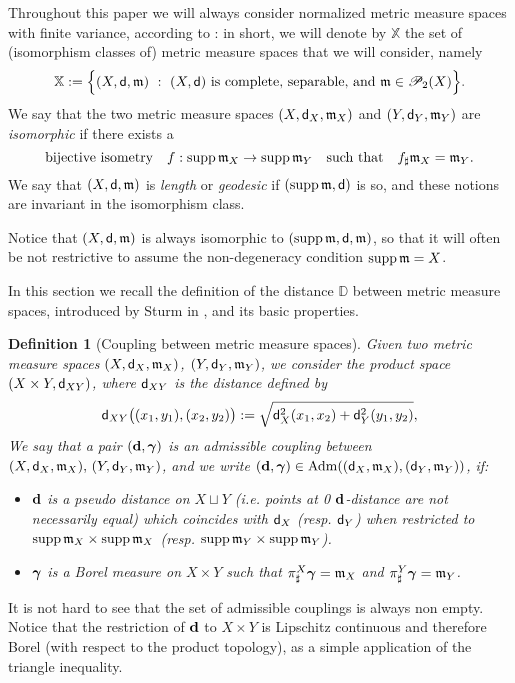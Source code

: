 \documentclass[reqno,11pt]{article}
\numberwithin{equation}{section}
\newcommand{\D}{\mathbb{D}}
\newcommand{\mm}{{\mbox{\boldmath$m$}}}
\newcommand{\ggamma}{{\mbox{\boldmath$\gamma$}}}
\newcommand{\sfd}{{\sf d}}
\newcommand{\supp}{\mathop{\rm supp}\nolimits}   %
\newcommand{\ProbabilitiesTwo}[1]{\mathscr P_2(#1)}     %
\newtheorem{definition}[theorem]{Definition}
\newcommand{\probt}{\ProbabilitiesTwo}
\newcommand{\adm}[2]{{\rm{Adm}}(#1,#2)}
\newcommand{\X}{\mathbb X}
\renewcommand{\mm}{\mathfrak m}
\begin{document}
Throughout this paper we will always consider normalized metric
measure spaces with finite variance, according to \cite[\S
3.1]{Sturm06I}: in short, we will denote by $\X$ the set of
(isomorphism classes of) metric measure spaces that we will
consider, namely
\begin{equation}
  \label{eq:1}
\X:=\Big\{(X,\sfd,\mm)\ :\ (X,\sfd)\textrm{ is complete,
  separable, and }\mm\in\probt X\Big\}.
\end{equation}
We say that the two metric measure spaces $(X,\sfd_X,\mm_X)$ and
$(Y,\sfd_Y,\mm_Y)$ are \emph{isomorphic} if there exists a
\begin{equation}\label{eq:isosturm}
\text{bijective isometry\quad $f:\supp\mm_X\to\supp\mm_Y$\quad such
that}\quad
 f_\sharp\mm_X=\mm_Y.
\end{equation}
We say that $(X,\sfd,\mm)$ is \emph{length} or \emph{geodesic} if
$(\supp\mm,\sfd)$ is so, and these notions are invariant in the
isomorphism class.

Notice that $(X,\sfd,\mm)$ is always isomorphic to
$(\supp\mm,\sfd,\mm)$, so that it will often be not restrictive to
assume the non-degeneracy condition $\supp\mm=X$.

In this section we recall the definition of the distance $\D$
between metric measure spaces, introduced by Sturm in
\cite{Sturm06I}, and its basic properties.

\begin{definition}[Coupling between metric measure spaces]
Given two metric measure spaces $(X,\sfd_X,\mm_X)$, $(Y,\sfd_Y,\mm_Y)$, we consider the product space
$(X\times Y,\sfd_{XY})$, where $\sfd_{XY}$ is the distance defined by
\[
\sfd_{XY}\big((x_1,y_1),(x_2,y_2)\big):=\sqrt{\sfd_X^2(x_1,x_2)+\sfd_Y^2(y_1,y_2)},
\]
We say that a pair $({\bf d},\ggamma)$ is an admissible coupling
between $(X,\sfd_X,\mm_X),\,(Y,\sfd_Y,\mm_Y)$, and we write $({\bf
d},\ggamma)\in\adm{(\sfd_X,\mm_X)}{(\sfd_Y,\mm_Y)}$, if:
\begin{itemize}
\item[(a)] ${\bf d}$ is a pseudo distance on $X\sqcup Y$ (i.e. points at 0
${\bf d}$-distance are not necessarily equal) which coincides with
$\sfd_X$ (resp. $\sfd_Y$) when restricted to
$\supp\mm_X\times\supp\mm_X$ (resp. $\supp\mm_Y\times\supp\mm_Y$).
\item[(b)] $\ggamma$ is a Borel measure
on $X\times Y$ such that $\pi^X_\sharp\ggamma=\mm_X$ and
$\pi^Y_\sharp\ggamma=\mm_Y$.
\end{itemize}
\end{definition}
It is not hard to see that the set of admissible couplings is always
non empty. Notice that the restriction of $\bf d$ to $X\times Y$ is
Lipschitz continuous and therefore Borel (with respect to the
product topology), as a simple application of the triangle
inequality.
\end{document}
